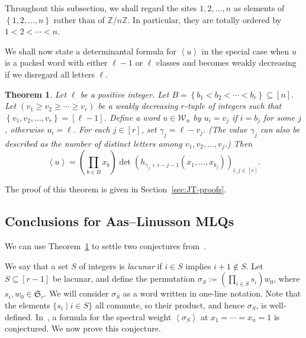 \documentclass[reqno]{amsart}
\newcommand{\0}{\phantom{c}}
\newcommand{\swt}[1]{\left\langle #1 \right\rangle} %
\newcommand{\SymGp}[1]{\mathfrak{S}_{#1}} %
\newcommand{\mcW}{\mathcal{W}}
\newcommand{\ZZ}{\mathbb{Z}}
\let\prodnonlimits\prod
\renewcommand{\prod}{\prodnonlimits\limits}
\newcommand{\set}[1]{\left\{ #1 \right\}}
\newcommand{\tup}[1]{\left( #1 \right)}
\newcommand{\ive}[1]{\left[ #1 \right]}
\newcommand{\defn}[1]{{\color{darkred}\emph{#1}}} %
\theoremstyle{plain}
\newtheorem{thm}{Theorem}[section]
\theoremstyle{definition}
\numberwithin{equation}{section}
\newcommand{\darij}[1]{\todo[size=\tiny,color=red!30]{#1 \\ \hfill --- Darij}}
\newcommand{\travis}[1]{\todo[size=\tiny,color=blue!30]{#1 \\ \hfill --- Travis}}
\begin{document}
Throughout this subsection, we shall regard the sites $1, 2, \ldots, n$ as elements of $\set{1, 2, \ldots, n}$ rather than of $\ZZ/n\ZZ$.
In particular, they are totally ordered by $1 < 2 < \cdots < n$.

We shall now state a determinantal formula for $\swt{u}$ in the special case when $u$ is a packed word with either $\ell-1$ or $\ell$ classes and becomes weakly decreasing if we disregard all letters $\ell$.

\begin{thm}
\label{thm:determinant_form}
Let $\ell$ be a positive integer.
Let $B = \set{ b_1 < b_2 < \cdots < b_r} \subseteq \ive{n}$.
Let $\tup{v_1 \geq v_2 \geq \cdots \geq v_r}$ be a weakly decreasing $r$-tuple of integers such that $\set{v_1, v_2, \ldots, v_r} = \ive{\ell-1}$.
Define a word $u \in \mcW_n$ by $u_i=v_j$ if $i = b_j$ for some $j$, otherwise $u_i = \ell$.
For each $j \in \ive{r}$, set $\gamma_j = \ell - v_j$.
(The value $\gamma_j$ can also be described as the number of distinct letters among $v_1, v_2, \dotsc, v_j$.)
Then
\[
\swt{u} = \left(  \prod_{b \in B} x_b \right)  \det \left(  h_{\gamma_j+i-j-1}(x_1,\dotsc,x_{b_j}) \right)_{i, j \in \ive{r}}.
\]
\end{thm}

The proof of this theorem is given in Section~\ref{sec:JT-proofs}.




\subsection{Conclusions for Aas--Linusson MLQs}

We can use Theorem~\ref{thm:determinant_form} to settle two conjectures from~\cite{AasLin17}.

We say that a set $S$ of integers is \defn{lacunar} if $i\in S$ implies $i+1 \notin S$.
Let $S \subseteq \ive{r-1}$ be lacunar, and define the permutation $\sigma_S := \left( \prod_{i \in S} s_i \right) w_0$, where $s_i, w_0 \in \SymGp{r}$.
We will consider $\sigma_S$ as a word written in one-line notation.
Note that the elements $\{s_i \mid i \in S\}$ all commute, so their product, and hence $\sigma_S$, is well-defined.
In~\cite[Conj.~3.10]{AasLin17}, a formula for the spectral weight $\swt{\sigma_S}$ at $x_1 = \cdots = x_n = 1$ is conjectured.
We now prove this conjecture.
\end{document}
